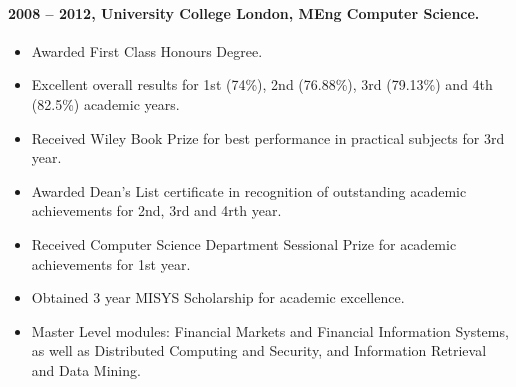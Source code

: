 \documentclass[11pt, a4paper]{article}
\newlength{\wideitemsep}
\let\olditem\item
\renewcommand{\item}{\setlength{\itemsep}{\wideitemsep}\olditem}
\begin{document}
\paragraph{2008 – 2012, University College London, MEng Computer Science.}
\begin{itemize}
\item Awarded First Class Honours Degree.
\item Excellent overall results for 1st (74\%), 2nd (76.88\%), 3rd (79.13\%) and 4th (82.5\%) academic years.
\item Received Wiley Book Prize for best performance in practical subjects for 3rd year.
\item Awarded Dean's List certificate in recognition of outstanding academic achievements for 2nd, 3rd and 4rth year.
\item Received Computer Science Department Sessional Prize for academic achievements for 1st year.
\item Obtained 3 year MISYS Scholarship for academic excellence.
\item Master Level modules: Financial Markets and Financial Information Systems, as well as Distributed Computing and Security, and Information Retrieval and Data Mining.
\end{itemize}
\end{document}
